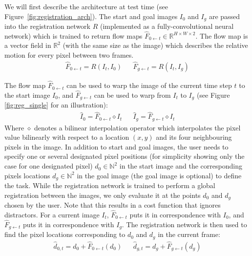 We will first describe the architecture at test time (see Figure~\ref{fig:registration_arch}). The start and goal images $I_0$ and $I_g$ are passed into the registration network $R$ (implemented as a fully-convolutional neural network) which is trained to return flow maps $\hat{F}_{0 \leftarrow t} \in \mathbb{R}^{H \times W \times 2}$. The flow map is a vector field in $\mathbb{R}^2$ (with the same size as the image) which describes the relative motion for every pixel between two frames.
\begin{align}
    \hat{F}_{0 \leftarrow t} = R(I_t, I_0) &&
    \hat{F}_{g \leftarrow t} = R(I_t, I_g)
\end{align}

The flow map $\hat{F}_{0 \leftarrow t}$ can be used to warp the image of the current time step $t$ to the start image $I_0$, and $\hat{F}_{g \leftarrow t}$ can be used to warp from $I_t$ to $I_g$ (see Figure \ref{fig:reg_single} for an illustration):
\begin{align}
    \hat{I}_0 = \hat{F}_{0 \leftarrow t} \diamond  I_t &&
    \hat{I}_g = \hat{F}_{g \leftarrow t} \diamond  I_t 
\end{align}
Where $\diamond$ denotes a bilinear interpolation operator which interpolates the pixel value bilinearly with respect to a location $(x,y)$ and its four neighbouring pixels in the image.
In addition to start and goal images, the user needs to specify one or several designated pixel positions (for simplicity showing only the case for one designated pixel) $d_0 \in \mathbb{N}^2$ in the start image and the corresponding pixels locations $d_g \in \mathbb{N}^2$ in the goal image (the goal image is optional) to define the task. While the registration network is trained to perform a global registration between the images, we only evaluate it at the points $d_0$ and $d_g$ chosen by the user. Note that this results in a cost function that ignores distractors. For a current image $I_t$, $\hat{F}_{0 \leftarrow t}$ puts it in correspondence with $I_0$, and $\hat{F}_{g \leftarrow t}$ puts it in correspondence with $I_g$. The registration network is then used to find the pixel locations corresponding to $d_0$ and $d_g$ in the current frame: 
\begin{align}
    \hat{d}_{0,t} = d_0 + \hat{F}_{0 \leftarrow t}(d_0) &&
    \hat{d}_{g,t} = d_g + \hat{F}_{g \leftarrow t}(d_g)
    \label{eqn:warped_pos}
\end{align}

